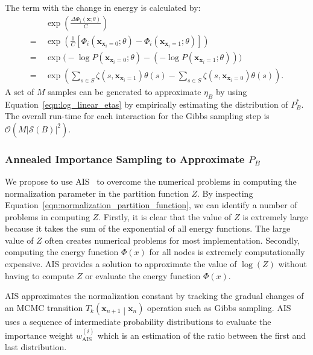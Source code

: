 \documentclass[letterpaper]{article} %
\begin{document}
				The term with the change in energy is calculated by:
				\begin{align*}
					&\exp{ \left( \frac{\Delta \Phi_i \left( \mathbf{x} ; \theta \right)}{C} \right) } \\
					=\ &\exp{ \left( \frac{1}{C} \left[ \Phi_i \left( \mathbf{x}_{\mathbf{x}_i = 0}; \theta \right) - \Phi_i \left( \mathbf{x}_{\mathbf{x}_i = 1}; \theta \right) \right] \right) } \\
					=\ &\exp{ \biggl( - \log P \left( \mathbf{x}_{\mathbf{x}_i = 0}; \theta \right) - \left(- \log P \left( \mathbf{x}_{\mathbf{x}_i = 1}; \theta \right) \right)  \biggr) } \\
					=\ &\exp{ \left( \sum_{s \in S} \zeta \left( s, \mathbf{x}_{\mathbf{x}_i = 1} \right) \theta \left( s \right) - \sum_{s \in S} \zeta \left( s, \mathbf{x}_{\mathbf{x}_i = 0} \right) \theta \left( s \right) \right) }.
				\end{align*}
				A set of $M$ samples can be generated to approximate $\eta_B$ by using Equation~\eqref{eqn:log_linear_etas} by empirically estimating the distribution of $P^*_B$. The overall run-time for each interaction for the Gibbs sampling step is $\mathcal{O} \left( M \left| \mathcal{S}(B) \right| ^2 \right)$.

			\subsubsection{Annealed Importance Sampling to Approximate $P_B$}
				We propose to use AIS~\cite{neal2001annealed,salakhutdinov2008learning} to overcome the numerical problems in computing the normalization parameter in the partition function $Z$. By inspecting Equation~\eqref{eqn:normalization_partition_function}, we can identify a number of problems in computing $Z$. Firstly, it is clear that the value of $Z$ is extremely large because it takes the sum of the exponential of all energy functions. The large value of $Z$ often creates numerical problems for most implementation. Secondly, computing the energy function $\Phi \left( x \right)$ for all nodes is extremely computationally expensive. AIS provides a solution to approximate the value of $\log \left(Z \right)$ without having to compute $Z$ or evaluate the energy function $\Phi \left( x \right)$.

				AIS approximates the normalization constant by tracking the gradual changes of an MCMC transition $T_k \left( \mathbf{x}_{n+1} \middle| \mathbf{x}_{n} \right)$ operation such as Gibbs sampling. AIS uses a sequence of intermediate probability distributions to evaluate the importance weight $w^{\left( i \right)}_{\mathrm{AIS}}$ which is an estimation of the ratio between the first and last distribution.
\end{document}

